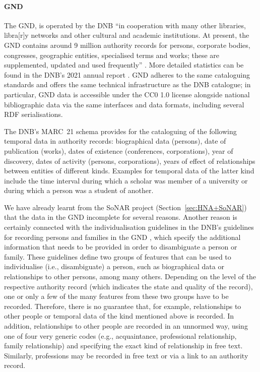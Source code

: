 \paragraph{GND}

%
The \gls{GND}, is operated by the \gls{DNB}
\enquote{in cooperation with many other libraries, libra[r]y networks and other cultural and academic institutions.
At present, the GND contains around 9 million authority records for persons, corporate bodies, congresses, geographic entities, specialised terms and works; these are supplemented, updated and used frequently} \autocite{DNB_cataloguing}. More detailed statistics can be found in the DNB's
2021 annual report \autocite[p.49]{DNB_Jahresbericht_2021}.
GND adheres to the same cataloguing standards and offers the same technical infrastructure
as the DNB catalogue; in particular, GND data is accessible under the CC0 1.0 license alongside national bibliographic data
via the same interfaces and data formats, including several RDF serialisations.

The DNB's MARC~21 schema \autocite{DNB_MARC21}
provides for the cataloguing of the following temporal data in authority records:
biographical data (persons), date of publication (works), dates of existence (conferences, corporations),
year of discovery, dates of activity (persons, corporations), years of effect of relationships
between entities of different kinds. Examples for temporal data of the latter kind include
the time interval during which a scholar was member of a university or during which a person was a student of another.

We have already learnt from the \gls{SoNAR} project (Section~\ref{sec:HNA+SoNAR}) 
that the data in the GND incomplete for several reasons.
Another reason is certainly connected with the individualisation guidelines
in the DNB's guidelines for recording persons and families in the GND
\autocite[part EH-P-16]{GND_Erfassungshilfen}, which specify the additional information
that needs to be provided in order to disambiguate a person or family.
These guidelines define two groups of features that can be used to individualise
(i.e., disambiguate) a person, such as biographical data or relationships to other persons, among many others.
Depending on the level of the respective authority record
(which indicates the state and quality of the record), one or only a few of the many features
from these two groups have to be recorded.
Therefore, there is no guarantee that, for example, relationships to other people
or temporal data of the kind mentioned above is recorded.
In addition, relationships to other people are recorded in an unnormed way,
using one of four very generic codes (e.g., acquaintance, professional relationship, family relationship)
and specifying the exact kind of relationship in free text.
Similarly, professions may be recorded in free text or via a link to an authority record.


